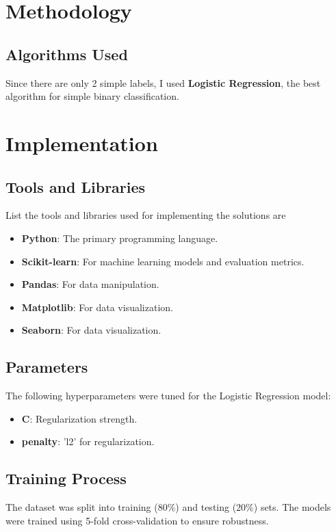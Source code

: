 \documentclass[12pt]{article}
\begin{document}
\section{Methodology}
\subsection{Algorithms Used}
Since there are only 2 simple labels, I used \textbf{Logistic Regression}, the best algorithm for simple binary classification.

\section{Implementation}
\subsection{Tools and Libraries}
List the tools and libraries used for implementing the solutions are
\begin{itemize}
    \item \textbf{Python}: The primary programming language.
    \item \textbf{Scikit-learn}: For machine learning models and evaluation metrics.
    \item \textbf{Pandas}: For data manipulation.
    \item \textbf{Matplotlib}: For data visualization.
    \item \textbf{Seaborn}: For data visualization.
\end{itemize}

\subsection{Parameters}
The following hyperparameters were tuned for the Logistic Regression model:
\begin{itemize}
    \item \textbf{C}: Regularization strength.
    \item \textbf{penalty}: 'l2' for regularization.
\end{itemize}

\subsection{Training Process}
The dataset was split into training (80\%) and testing (20\%) sets. The models were trained using 5-fold cross-validation to ensure robustness.
\end{document}
